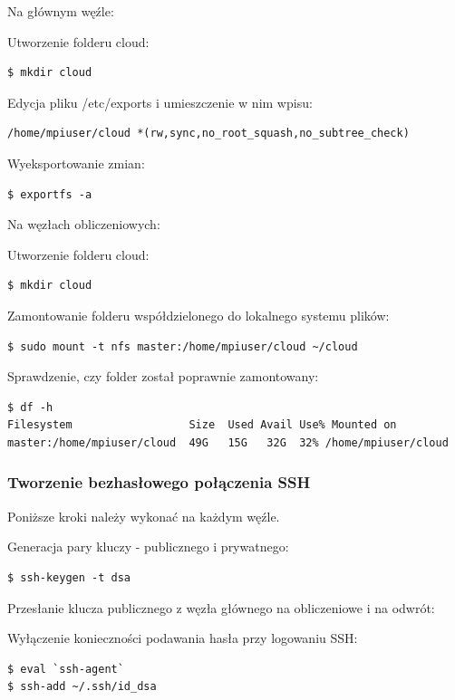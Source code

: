 \documentclass{article}
\begin{document}
Na głównym węźle:

Utworzenie folderu cloud:
\begin{lstlisting}
$ mkdir cloud
\end{lstlisting}

Edycja pliku /etc/exports i umieszczenie w nim wpisu:
\begin{lstlisting}
/home/mpiuser/cloud *(rw,sync,no_root_squash,no_subtree_check)
\end{lstlisting}

Wyeksportowanie zmian:

\begin{lstlisting}
$ exportfs -a
\end{lstlisting}
\newpage
Na węzłach obliczeniowych:

Utworzenie folderu cloud:
\begin{lstlisting}
$ mkdir cloud
\end{lstlisting}

Zamontowanie folderu współdzielonego do lokalnego systemu plików:
\begin{lstlisting}
$ sudo mount -t nfs master:/home/mpiuser/cloud ~/cloud
\end{lstlisting}

Sprawdzenie, czy folder został poprawnie zamontowany:
\begin{lstlisting}
$ df -h
Filesystem                  Size  Used Avail Use% Mounted on
master:/home/mpiuser/cloud  49G   15G   32G  32% /home/mpiuser/cloud
\end{lstlisting}

\subsubsection{Tworzenie bezhasłowego połączenia SSH}
Poniższe kroki należy wykonać na każdym węźle.

Generacja pary kluczy - publicznego i prywatnego:
\begin{lstlisting}
$ ssh-keygen -t dsa
\end{lstlisting}

Przesłanie klucza publicznego z węzła głównego na obliczeniowe i na odwrót:

Wyłączenie konieczności podawania hasła przy logowaniu SSH:
\begin{lstlisting}
$ eval `ssh-agent`
$ ssh-add ~/.ssh/id_dsa
\end{lstlisting}
\end{document}
